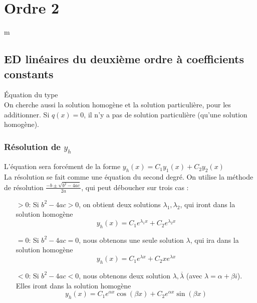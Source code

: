 \documentclass[12pt,a4paper]{article}
\renewcommand{\)}{\right)}
\renewcommand{\(}{\left(}
\begin{document}
\section{Ordre 2}
m\subsection{ED linéaires du deuxième ordre à coefficients constants}
Équation du type \\
On cherche aussi la solution homogène et la solution particulière, pour les additionner. Si $q(x) = 0$, il n'y a pas de solution particulière (qu'une solution homogène).
\subsubsection{Résolution de $y_h$}
L'équation sera forcément de la forme $y_h(x) = C_1y_1(x) + C_2y_2(x)$\\
La résolution se fait comme une équation du second degré. On utilise la méthode de résolution $\frac{-b \pm \sqrt{b^2-4ac}}{2a}$, qui peut déboucher sur trois cas :
\begin{itemize}
	\item[$>0$: ]	Si $b^2-4ac > 0$, on obtient deux solutions $\lambda_1,\lambda_2$, qui iront dans la solution homogène
					\begin{equation*}
						y_h(x) = C_1e^{\lambda_1 x} + C_2e^{\lambda_2 x}
					\end{equation*}
	\item[$=0$: ]	Si $b^2-4ac = 0$, nous obtenons une seule solution $\lambda$, qui ira dans la solution homogène 
					\begin{equation*}
						y_h(x) = C_1e^{\lambda x} + C_2xe^{\lambda x}
					\end{equation*}
	\item[$<0$: ]	Si $b^2-4ac < 0$, nous obtenons deux solution $\lambda, \overline{\lambda}$ (avec $\lambda = \alpha + \beta i$). Elles iront dans la solution homogène
					\begin{equation*}
						y_h(x) = C_1e^{\alpha x}\cos(\beta x) + C_2e^{\alpha x}\sin(\beta x)
					\end{equation*}
\end{itemize}
\end{document}

